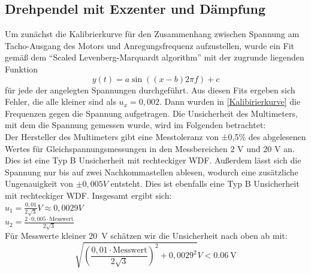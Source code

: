 \documentclass[
	a4paper,
	12pt,
	pagesize,
	ngerman
]{scrartcl}
\begin{document}
	\subsection{Drehpendel mit Exzenter und Dämpfung}
	
	Um zunächst die Kalibrierkurve für den Zusammenhang zwischen Spannung am Tacho-Ausgang des Motors und Anregungsfrequenz aufzustellen, wurde ein Fit gemäß dem \enquote{Scaled Levenberg-Marquardt algorithm} mit der zugrunde liegenden Funktion
	\begin{equation}
	y(t) = a \sin ((x-b)2 \pi f) + c
	\end{equation}
	für jede der angelegten Spannungen durchgeführt. Aus diesen Fits ergeben sich Fehler, die alle kleiner sind als $ u_x = 0,002 $. Dann wurden in \cref{Kalibirierkurve} die Frequenzen gegen die Spannung aufgetragen. Die Unsicherheit des Multimeters, mit dem die Spannung gemessen wurde, wird im Folgenden betrachtet: \\
	Der Hersteller des Multimeters gibt eine Messtoleranz von ±0,5\% des abgelesenen Wertes für Gleichspannungsmessungen in den Messbereichen 2 V und 20 V an. Dies ist eine Typ B Unsicherheit mit rechteckiger WDF. Außerdem lässt sich die Spannung nur bis auf zwei Nachkommastellen ablesen, wodurch eine zusätzliche Ungenauigkeit von $\pm 0,005\si{V}$ entsteht. Dies ist ebenfalls eine Typ B Unsicherheit mit rechteckiger WDF. Insgesamt ergibt sich: \\
	$u_1= \frac{0,01}{2\sqrt{3}} \si{V} \approx 0,0029 \si{V}$ \\
	$u_2= \frac{2 \cdot 0,005 \cdot \text{Messwert}}{2 \sqrt{3}}$ \\ %
	Für Messwerte kleiner \SI{20}{\volt} schätzen wir die Unsicherheit nach oben ab mit:
	\begin{equation*}
		\sqrt{(\frac{0,01 \cdot \text{Messwert}}{2 \sqrt{3}})^2 + 0,0029^2} \si{V} <  \SI{0,06}{\volt}
	\end{equation*}
	
\end{document}
